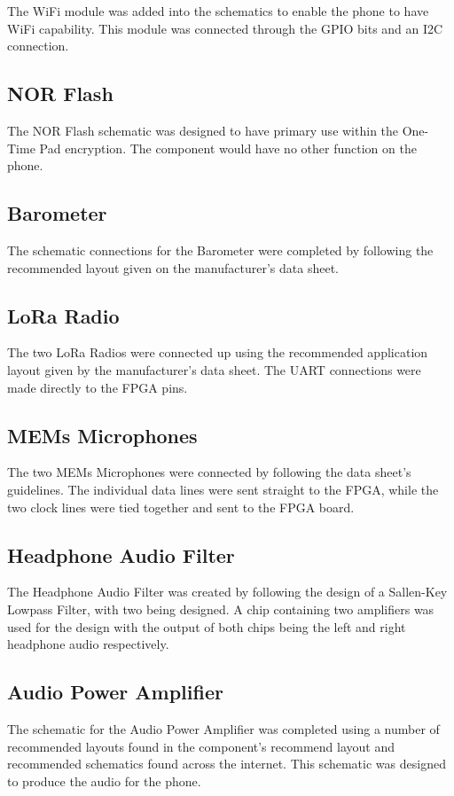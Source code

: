 	The WiFi module was added into the schematics to enable the phone to have WiFi capability. This module was connected through the GPIO bits and an I2C connection.

\subsection{NOR Flash}

	The NOR Flash schematic was designed to have primary use within the One-Time Pad encryption. The component would have no other function on the phone. 

\subsection{Barometer}

	The schematic connections for the Barometer were completed by following the recommended layout given on the manufacturer's data sheet. 

\subsection{LoRa Radio}

	The two LoRa Radios were connected up using the recommended application layout given by the manufacturer's data sheet. The UART connections were made directly to the FPGA pins.

\subsection{MEMs Microphones}
\label{chap:mics}
	The two MEMs Microphones were connected by following the data sheet's guidelines. The individual data lines were sent straight to the FPGA, while the two clock lines were tied together and sent to the FPGA board. 

\subsection{Headphone Audio Filter} 
\label{chap:audio2}
	The Headphone Audio Filter was created by following the design of a Sallen-Key Lowpass Filter, with two being designed. A chip containing two amplifiers was used for the design with the output of both chips being the left and right headphone audio respectively. 

\subsection{Audio Power Amplifier}
\label{chap:audio}
	The schematic for the Audio Power Amplifier was completed using a number of recommended layouts found in the component's recommend layout and recommended schematics found across the internet. This schematic was designed to produce the audio for the phone. 

